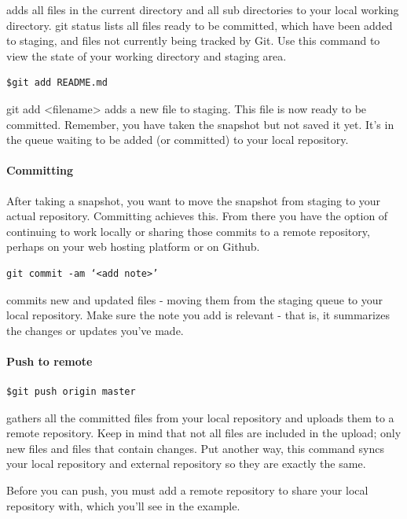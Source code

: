 adds all files in the current directory and all sub directories to your local working directory.
git status lists all files ready to be committed, which have been added to staging, and files not currently being tracked by Git. Use this command to view the state of your working directory and staging area.

\begin{verbatim}
$git add README.md
\end{verbatim}
git add <filename> adds a new file to staging. This file is now ready to be committed. 
Remember, you have taken the snapshot but not saved it yet. It’s in the queue waiting
to be added (or committed) to your local repository.

\paragraph*{Committing}

After taking a snapshot, you want to move the snapshot from staging to your actual repository. Committing achieves this. From there you have the option of continuing to work locally or sharing those commits to a remote repository, perhaps on your web hosting platform or on Github.

\begin{verbatim}
git commit -am ‘<add note>’ 
\end{verbatim}

commits new and updated files - moving them from the staging queue to your local repository. Make sure the note you add is relevant - that is, it summarizes the changes or updates you’ve made.

\paragraph*{Push to remote}

\begin{verbatim}
$git push origin master 
\end{verbatim}

gathers all the committed files from your local repository and uploads them to a remote repository. Keep in mind that not all files are included in the upload; only new files and files that contain changes. Put another way, this command syncs your local repository and external repository so they are exactly the same.

Before you can push, you must add a remote repository to share your local repository with, which you’ll see in the example.

